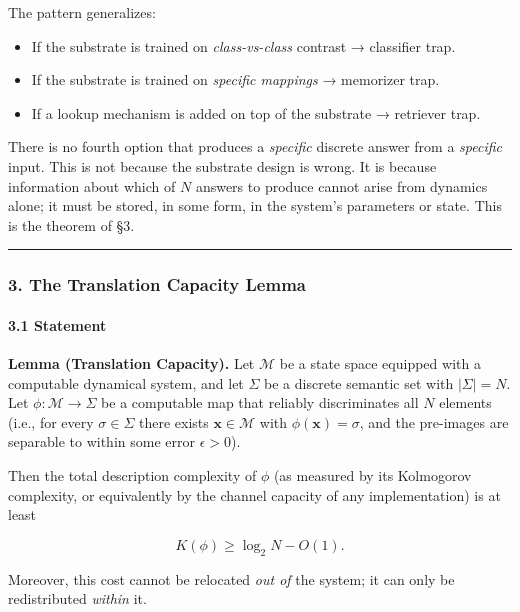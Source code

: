 \documentclass[
  11pt,
  a4paper,
]{article}
\providecommand{\tightlist}{%
  \setlength{\itemsep}{0pt}\setlength{\parskip}{0pt}}
\begin{document}
The pattern generalizes:

\begin{itemize}
\tightlist
\item
  If the substrate is trained on \emph{class-vs-class} contrast →
  classifier trap.
\item
  If the substrate is trained on \emph{specific mappings} → memorizer
  trap.
\item
  If a lookup mechanism is added on top of the substrate → retriever
  trap.
\end{itemize}

There is no fourth option that produces a \emph{specific} discrete
answer from a \emph{specific} input. This is not because the substrate
design is wrong. It is because information about which of \(N\) answers
to produce cannot arise from dynamics alone; it must be stored, in some
form, in the system's parameters or state. This is the theorem of §3.

\begin{center}\rule{0.5\linewidth}{0.5pt}\end{center}

\subsubsection{3. The Translation Capacity
Lemma}\label{the-translation-capacity-lemma}

\paragraph{3.1 Statement}\label{statement}

\textbf{Lemma (Translation Capacity).} Let \(\mathcal{M}\) be a state
space equipped with a computable dynamical system, and let \(\Sigma\) be
a discrete semantic set with \(|\Sigma| = N\). Let
\(\phi: \mathcal{M} \to \Sigma\) be a computable map that reliably
discriminates all \(N\) elements (i.e., for every \(\sigma \in \Sigma\)
there exists \(\mathbf{x} \in \mathcal{M}\) with
\(\phi(\mathbf{x}) = \sigma\), and the pre-images are separable to
within some error \(\epsilon > 0\)).

Then the total description complexity of \(\phi\) (as measured by its
Kolmogorov complexity, or equivalently by the channel capacity of any
implementation) is at least

\[
K(\phi) \geq \log_2 N - O(1).
\]

Moreover, this cost cannot be relocated \emph{out of} the system; it can
only be redistributed \emph{within} it.
\end{document}
